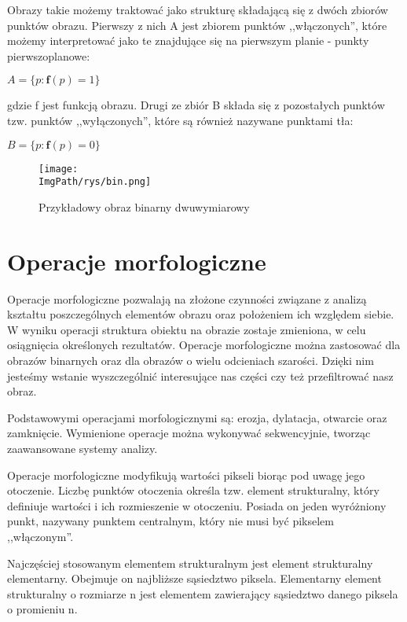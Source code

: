 \documentclass[a4paper,12pt,twoside,openany]{report}
\newcommand{\ImgPath}{.}
\begin{document}
Obrazy takie możemy traktować jako strukturę składającą się z dwóch zbiorów punktów obrazu. Pierwszy z nich A jest zbiorem punktów ,,włączonych'', które możemy interpretować jako te znajdujące się na pierwszym planie - punkty pierwszoplanowe:
\begin{center}
	$ A = \{p \colon \textbf{f}(p) = 1\} $ 
\end{center}
gdzie f jest funkcją obrazu. Drugi ze zbiór B składa się z pozostałych punktów tzw. punktów ,,wyłączonych'', które są również nazywane punktami tła:
\begin{center}
	$ B = \{p \colon \textbf{f}(p) = 0\} $ 
\end{center}

\begin{figure}[H]	
	\centering
	\texttt{[image: \\ImgPath/rys/bin.png]}
	
	\caption{Przykładowy obraz binarny dwuwymiarowy}
\end{figure}

\section{Operacje morfologiczne}
Operacje morfologiczne pozwalają na złożone czynności związane z analizą kształtu poszczególnych elementów obrazu oraz położeniem ich względem siebie. W wyniku operacji struktura obiektu na obrazie zostaje zmieniona, w celu osiągnięcia określonych rezultatów. 
Operacje morfologiczne można zastosować dla obrazów binarnych oraz dla obrazów o wielu odcieniach szarości\cite{Malina}. Dzięki nim jesteśmy wstanie wyszczególnić interesujące nas części czy też przefiltrować nasz obraz. 

Podstawowymi operacjami morfologicznymi są: erozja, dylatacja, otwarcie oraz zamknięcie. Wymienione operacje można wykonywać sekwencyjnie, tworząc zaawansowane systemy analizy.

Operacje morfologiczne modyfikują wartości pikseli biorąc pod uwagę jego otoczenie. Liczbę punktów otoczenia określa tzw. element strukturalny, który definiuje wartości i ich rozmieszenie w otoczeniu. Posiada on jeden wyróżniony punkt, nazywany punktem centralnym, który nie musi być pikselem ,,włączonym''. 

Najczęściej stosowanym elementem strukturalnym jest element strukturalny elementarny. Obejmuje on najbliższe sąsiedztwo piksela. Elementarny element strukturalny  o rozmiarze n jest elementem zawierający sąsiedztwo danego piksela o promieniu n\cite{Iwanowski}. 
\end{document}

